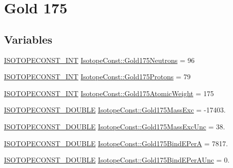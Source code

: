 \hypertarget{group___isotope_const-_gold-_au175}{}\section{Gold 175}
\label{group___isotope_const-_gold-_au175}
\subsection*{Variables}
\begin{DoxyCompactItemize}
\item 
\mbox{\hyperlink{group___isotope_const-_macros_ga5f18360b3e99483a35c32d789e62621c}{I\+S\+O\+T\+O\+P\+E\+C\+O\+N\+S\+T\+\_\+\+I\+NT}} \mbox{\hyperlink{group___isotope_const-_gold-_au175_ga5c117d3ca82542610ba728a991d38889}{Isotope\+Const\+::\+Gold175\+Neutrons}} = 96
\item 
\mbox{\hyperlink{group___isotope_const-_macros_ga5f18360b3e99483a35c32d789e62621c}{I\+S\+O\+T\+O\+P\+E\+C\+O\+N\+S\+T\+\_\+\+I\+NT}} \mbox{\hyperlink{group___isotope_const-_gold-_au175_gae7f8798c397427e188d7937454e52714}{Isotope\+Const\+::\+Gold175\+Protons}} = 79
\item 
\mbox{\hyperlink{group___isotope_const-_macros_ga5f18360b3e99483a35c32d789e62621c}{I\+S\+O\+T\+O\+P\+E\+C\+O\+N\+S\+T\+\_\+\+I\+NT}} \mbox{\hyperlink{group___isotope_const-_gold-_au175_ga06ee3b760bcc73bf0d9e76ae8347c91a}{Isotope\+Const\+::\+Gold175\+Atomic\+Weight}} = 175
\item 
\mbox{\hyperlink{group___isotope_const-_macros_ga8f45a7272ce02c0b4c65c44636ed719a}{I\+S\+O\+T\+O\+P\+E\+C\+O\+N\+S\+T\+\_\+\+D\+O\+U\+B\+LE}} \mbox{\hyperlink{group___isotope_const-_gold-_au175_ga2a81675cfb0d7d866c401f39b3c6aa59}{Isotope\+Const\+::\+Gold175\+Mass\+Exc}} = -\/17403.
\item 
\mbox{\hyperlink{group___isotope_const-_macros_ga8f45a7272ce02c0b4c65c44636ed719a}{I\+S\+O\+T\+O\+P\+E\+C\+O\+N\+S\+T\+\_\+\+D\+O\+U\+B\+LE}} \mbox{\hyperlink{group___isotope_const-_gold-_au175_ga58799249320d27de2084843e5965791a}{Isotope\+Const\+::\+Gold175\+Mass\+Exc\+Unc}} = 38.
\item 
\mbox{\hyperlink{group___isotope_const-_macros_ga8f45a7272ce02c0b4c65c44636ed719a}{I\+S\+O\+T\+O\+P\+E\+C\+O\+N\+S\+T\+\_\+\+D\+O\+U\+B\+LE}} \mbox{\hyperlink{group___isotope_const-_gold-_au175_gad31810ab64ff4ce651dfd4fe3f13d73b}{Isotope\+Const\+::\+Gold175\+Bind\+E\+PerA}} = 7817.
\item 
\mbox{\hyperlink{group___isotope_const-_macros_ga8f45a7272ce02c0b4c65c44636ed719a}{I\+S\+O\+T\+O\+P\+E\+C\+O\+N\+S\+T\+\_\+\+D\+O\+U\+B\+LE}} \mbox{\hyperlink{group___isotope_const-_gold-_au175_gab24de39029b0da5894b8aa5f3a05f499}{Isotope\+Const\+::\+Gold175\+Bind\+E\+Per\+A\+Unc}} = 0.

\end{DoxyCompactItemize}
